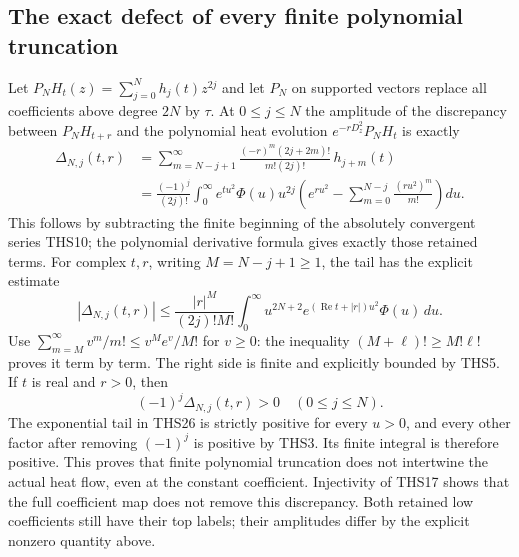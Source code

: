 \documentclass[11pt]{article}
\theoremstyle{definition}
\begin{document}
\subsection{The exact defect of every finite polynomial truncation}

Let $P_NH_t(z)=\sum_{j=0}^Nh_j(t)z^{2j}$ and let $P_N$ on
supported vectors replace all coefficients above degree $2N$
by $\tau$. At $0\le j\le N$ the amplitude of the discrepancy
between $P_NH_{t+r}$ and the polynomial heat evolution
$e^{-rD_z^2}P_NH_t$ is exactly
\begin{equation}\tag{THS26}
\begin{split}
 \Delta_{N,j}(t,r)
 &=\sum_{m=N-j+1}^{\infty}
       \frac{(-r)^m(2j+2m)!}{m!(2j)!}\,h_{j+m}(t)\\
 &=\frac{(-1)^j}{(2j)!}\int_0^\infty e^{tu^2}\Phi(u)u^{2j}
   \left(e^{ru^2}-\sum_{m=0}^{N-j}\frac{(ru^2)^m}{m!}\right)du.
\end{split}
\end{equation}
This follows by subtracting the finite beginning of the absolutely
convergent series THS10; the polynomial derivative formula gives
exactly those retained terms. For complex $t,r$, writing
$M=N-j+1\ge1$, the tail has the explicit estimate
\begin{equation}\tag{THS27}
 |\Delta_{N,j}(t,r)|
 \le\frac{|r|^M}{(2j)!M!}
      \int_0^\infty u^{2N+2}
          e^{(\operatorname{Re}t+|r|)u^2}\Phi(u)\,du.
\end{equation}
Use $\sum_{m=M}^{\infty}v^m/m!\le v^Me^v/M!$ for $v\ge0$:
the inequality $(M+\ell)!\ge M!\ell!$ proves it term by term.
The right side is finite and explicitly bounded by THS5.
If $t$ is real and $r>0$, then
\begin{equation}\tag{THS28}
             (-1)^j\Delta_{N,j}(t,r)>0
             \quad(0\le j\le N).
\end{equation}
The exponential tail in THS26 is strictly positive for every
$u>0$, and every other factor after removing $(-1)^j$ is
positive by THS3. Its finite integral is therefore positive.
This proves that finite polynomial truncation does not
intertwine the actual heat flow, even at the constant coefficient.
Injectivity of THS17 shows that the full coefficient map does
not remove this discrepancy. Both retained low coefficients
still have their top labels; their amplitudes differ by the
explicit nonzero quantity above.
\end{document}
